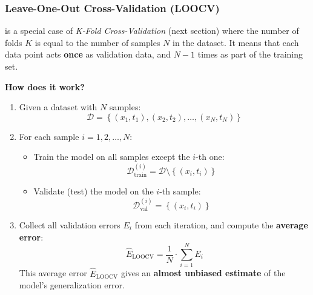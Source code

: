 \subsubsection{Leave-One-Out Cross-Validation (LOOCV)}\label{sec:leave-one-out-cross-validation}

 is a special case of \emph{K-Fold Cross-Validation} (next section) where the number of folds $K$ is equal to the number of samples $N$ in the dataset. It means that each data point acts \textbf{once} as validation data, and $N-1$ times as part of the training set.

\highspace
\begin{flushleft}
    \textcolor{Green3}{ \textbf{How does it work?}}
\end{flushleft}
\begin{enumerate}
    \item Given a dataset with $N$ samples:
    \begin{equation*}
        \mathcal{D} = \left\{
            \left(x_1, t_1\right),
            \left(x_2, t_2\right),
            \ldots,
            \left(x_N, t_N\right)
        \right\}
    \end{equation*}
    \item For each sample $i = 1, 2, \ldots, N$:
    \begin{itemize}
        \item Train the model on all samples except the $i$-th one:
        \begin{equation*}
            \mathcal{D}_{\text{train}}^{(i)} = \mathcal{D} \setminus \left\{ \left(x_i, t_i\right) \right\}
        \end{equation*}
        \item Validate (test) the model on the $i$-th sample:
        \begin{equation*}
            \mathcal{D}_{\text{val}}^{(i)} = \left\{ \left(x_i, t_i\right) \right\}
        \end{equation*}
    \end{itemize}
    \item Collect all validation errors $E_{i}$ from each iteration, and compute the \textbf{average error}:
    \begin{equation*}
        \hat{E}_{\text{LOOCV}} = \dfrac{1}{N} \cdot \sum_{i=1}^{N} E_{i}
    \end{equation*}
    This average error $\hat{E}_{\text{LOOCV}}$ gives an \textbf{almost unbiased estimate} of the model's generalization error.
\end{enumerate}
